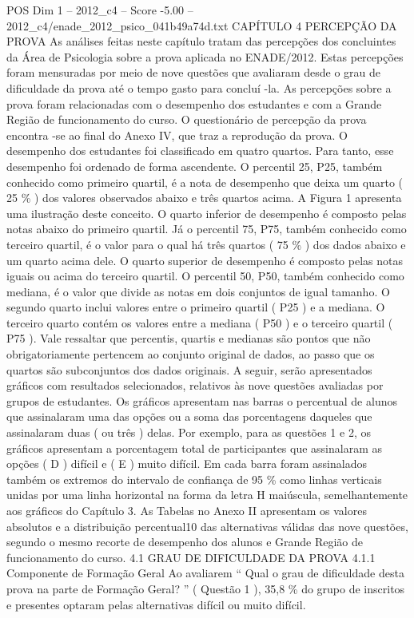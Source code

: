 \begin{textsample}{POS Dim 1 – 2012\_c4 – Score -5.00 – 2012\_c4/enade\_2012\_psico\_041b49a74d.txt}  \label{ex:f1_pos_369}
CAPÍTULO 4 PERCEPÇÃO DA PROVA As análises feitas neste capítulo tratam das percepções dos concluintes da Área de Psicologia sobre a prova aplicada no ENADE/2012.
Estas percepções foram mensuradas por meio de nove questões que avaliaram desde o grau de dificuldade da prova até o tempo gasto para concluí -la.
As percepções sobre a prova foram relacionadas com o desempenho dos estudantes e com a Grande Região de funcionamento do curso.
O questionário de percepção da prova encontra -se ao final do Anexo IV, que traz a reprodução da prova.
O desempenho dos estudantes foi classificado em quatro quartos.
Para tanto, esse desempenho foi ordenado de forma ascendente.
O percentil 25, P25, também conhecido como primeiro quartil, é a nota de desempenho que deixa um quarto ( 25 \% ) dos valores observados abaixo e três quartos acima.
A Figura 1 apresenta uma ilustração deste conceito.
O quarto inferior de desempenho é composto pelas notas abaixo do primeiro quartil.
Já o percentil 75, P75, também conhecido como terceiro quartil, é o valor para o qual há três quartos ( 75 \% ) dos dados abaixo e um quarto acima dele.
O quarto superior de desempenho é composto pelas notas iguais ou acima do terceiro quartil.
O percentil 50, P50, também conhecido como mediana, é o valor que divide as notas em dois conjuntos de igual tamanho.
O segundo quarto inclui valores entre o primeiro quartil ( P25 ) e a mediana.
O terceiro quarto contém os valores entre a mediana ( P50 ) e o terceiro quartil ( P75 ).
Vale ressaltar que percentis, quartis e medianas são pontos que não obrigatoriamente pertencem ao conjunto original de dados, ao passo que os quartos são subconjuntos dos dados originais.
A seguir, serão apresentados gráficos com resultados selecionados, relativos às nove questões avaliadas por grupos de estudantes.
Os gráficos apresentam nas barras o percentual de alunos que assinalaram uma das opções ou a soma das porcentagens daqueles que assinalaram duas ( ou três ) delas.
Por exemplo, para as questões 1 e 2, os gráficos apresentam a porcentagem total de participantes que assinalaram as opções ( D ) difícil e ( E ) muito difícil.
Em cada barra foram assinalados também os extremos do intervalo de confiança de 95 \% como linhas verticais unidas por uma linha horizontal na forma da letra H maiúscula, semelhantemente aos gráficos do Capítulo 3.
As Tabelas no Anexo II apresentam os valores absolutos e a distribuição percentual10 das alternativas válidas das nove questões, segundo o mesmo recorte de desempenho dos alunos e Grande Região de funcionamento do curso. 4.1 GRAU DE DIFICULDADE DA PROVA 4.1.1 Componente de Formação Geral Ao avaliarem “ Qual o grau de dificuldade desta prova na parte de Formação Geral? ” ( Questão 1 ), 35,8 \% do grupo de inscritos e presentes optaram pelas alternativas difícil ou muito difícil.

\end{textsample}
